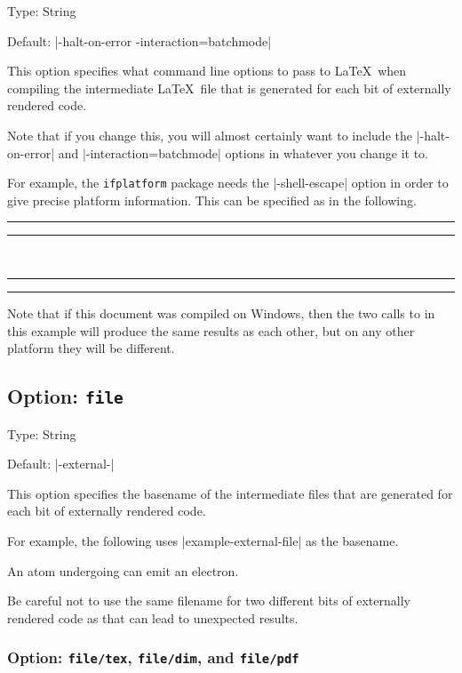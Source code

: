 \documentclass[10pt]{ltxdoc}
\newcommand{\pkg}[1]{\texttt{#1}}
\newcommand{\opt}[1]{\texttt{#1}}
\def\sz{%
  \rule{0.2em}{7pt}%
  \llap{\rule[8pt]{0.2em}{2pt}}%
}
\begin{document}
Type: String

Default: |-halt-on-error -interaction=batchmode|

This option specifies what command line options to pass to \LaTeX\ when
compiling the intermediate \LaTeX\ file that is generated for each bit
of externally rendered code.

Note that if you change this, you will almost certainly want to include
the |-halt-on-error| and |-interaction=batchmode| options in whatever
you change it to.

For example, the \pkg{ifplatform} package needs the |-shell-escape|
option in order to give precise platform information.
This can be specified as in the following.

\begin{tcblisting}{}
\sz
\external[preamble={\usepackage{ifplatform}}]
  {\platformname}%
\sz~\sz
\external[preamble={\usepackage{ifplatform}},
          latex/options={-shell-escape -halt-on-error
                         -interaction=batchmode}]
  {\platformname}%
\sz
\end{tcblisting}

Note that if this document was compiled on Windows, then the two calls
to  in this example will produce the same results as each
other, but on any other platform they will be different.

\subsection{Option: \opt{file}}
\label{subsec:file}

Type: String

Default: |\jobname-external-|

This option specifies the basename of the intermediate files that are
generated for each bit of externally rendered code.

For example, the following uses |example-external-file| as the
basename.

\begin{tcblisting}{}
An atom undergoing
can emit an electron.
\end{tcblisting}

Be careful not to use the same filename for two different bits of
externally rendered code as that can lead to unexpected results.

\subsubsection{Option: \opt{file/tex}, \opt{file/dim}, and \opt{file/pdf}}
\end{document}
